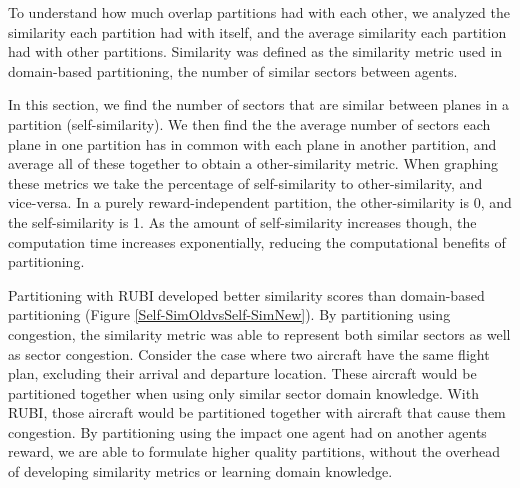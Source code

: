 \documentclass[letterpaper]{article}
\begin{document}
To understand how much overlap partitions had with each other, we analyzed the similarity each partition had with itself, and the average similarity each partition had with other partitions. Similarity was defined as the similarity metric used in domain-based partitioning, the number of similar sectors between agents.

In this section, we find the number of sectors that are similar between planes in a partition (self-similarity). We then find the the average number of sectors each plane in one partition has in common with each plane in another partition, and average all of these together to obtain a other-similarity metric. When graphing these metrics we take the percentage of self-similarity to other-similarity, and vice-versa. In a purely reward-independent partition, the other-similarity is 0, and the self-similarity is 1. As the amount of self-similarity increases though, the computation time increases exponentially, reducing the computational benefits of partitioning.


Partitioning with RUBI developed better similarity scores than domain-based partitioning (Figure \ref{Self-SimOldvsSelf-SimNew}). By partitioning using congestion, the similarity metric was able to represent both similar sectors as well as sector congestion. Consider the case where two aircraft have the same flight plan, excluding their arrival and departure location. These aircraft would be partitioned together when using only similar sector domain knowledge. With RUBI, those aircraft would be partitioned together with aircraft that cause them congestion. By partitioning using the impact one agent had on another agents reward, we are able to formulate higher quality partitions, without the overhead of developing similarity metrics or learning domain knowledge.
\end{document}
